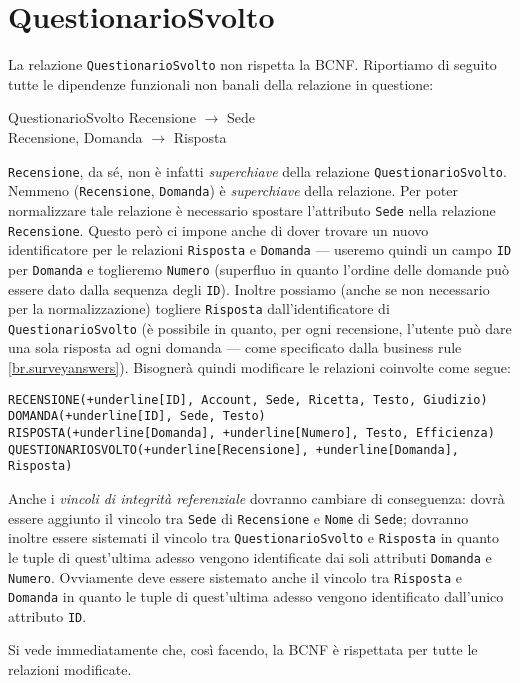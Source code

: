 \section{QuestionarioSvolto}\label{sec:questionariosvolto}
La relazione {\tt QuestionarioSvolto} non rispetta la BCNF. Riportiamo di seguito tutte
le dipendenze funzionali non banali della relazione in questione:
\begin{funcdep}{QuestionarioSvolto}
    Recensione $\to$ Sede\\
    Recensione, Domanda $\to$ Risposta
\end{funcdep}
\noindent\texttt{Recensione}, da sé, non è infatti {\it superchiave} della relazione {\tt QuestionarioSvolto}. Nemmeno
({\tt Recensione}, {\tt Domanda}) è {\it superchiave} della relazione.
Per poter normalizzare tale relazione è necessario spostare l'attributo {\tt Sede} nella
relazione {\tt Recensione}. Questo però ci impone anche di dover trovare un nuovo identificatore
per le relazioni {\tt Risposta} e {\tt Domanda} --- useremo quindi un campo {\tt ID} per {\tt Domanda} e
toglieremo {\tt Numero} (superfluo in quanto l'ordine delle domande può essere dato dalla sequenza
degli {\tt ID}). Inoltre possiamo (anche se non necessario per la normalizzazione)
togliere {\tt Risposta} dall'identificatore di {\tt QuestionarioSvolto} (è
possibile in quanto, per ogni recensione, l'utente può dare una sola risposta ad ogni
domanda --- come specificato dalla business rule \ref{br.surveyanswers}). Bisognerà
quindi modificare le relazioni coinvolte come segue:

\begin{Verbatim}[commandchars=+\[\]]
RECENSIONE(+underline[ID], Account, Sede, Ricetta, Testo, Giudizio)
DOMANDA(+underline[ID], Sede, Testo)
RISPOSTA(+underline[Domanda], +underline[Numero], Testo, Efficienza)
QUESTIONARIOSVOLTO(+underline[Recensione], +underline[Domanda], Risposta)
\end{Verbatim}
Anche i {\it vincoli di integrità referenziale} dovranno cambiare di conseguenza: dovrà
essere aggiunto il vincolo tra {\tt Sede} di {\tt Recensione} e {\tt Nome} di {\tt Sede}; dovranno
inoltre essere sistemati il vincolo tra {\tt QuestionarioSvolto} e {\tt Risposta} in quanto le tuple di quest'ultima
adesso vengono identificate dai soli attributi {\tt Domanda} e {\tt Numero}. Ovviamente deve essere
sistemato anche il vincolo tra {\tt Risposta} e {\tt Domanda} in quanto le tuple di quest'ultima adesso
vengono identificato dall'unico attributo {\tt ID}.

\vspace{10pt}
\noindent Si vede immediatamente che, così facendo, la BCNF è rispettata per tutte le relazioni modificate.
